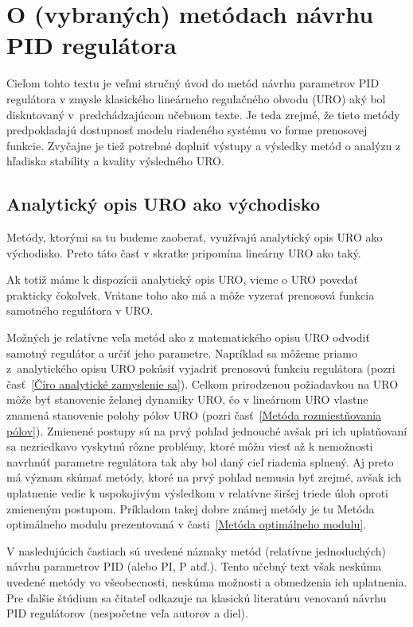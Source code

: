 \documentclass[a4paper, 10pt, ]{article}
\begin{document}
\section[O metódach návrhu PID regulátora]{O (vybraných) metódach návrhu PID regulátora}

Cieľom tohto textu je veľmi stručný úvod do metód návrhu parametrov PID regulátora v zmysle klasického lineárneho regulačného obvodu (URO) aký bol diskutovaný v~predchádzajúcom učebnom texte. Je teda zrejmé, že tieto metódy predpokladajú dostupnosť modelu riadeného systému vo forme prenosovej funkcie. Zvyčajne je tiež potrebné doplniť výstupy a výsledky metód o analýzu z hľadiska stability a kvality výsledného URO.


\subsection{Analytický opis URO ako východisko}

Metódy, ktorými sa tu budeme zaoberať, využívajú analytický opis URO ako východisko. Preto táto časť v skratke pripomína lineárny URO ako taký.

Ak totiž máme k dispozícii analytický opis URO, vieme o URO povedať prakticky čokoľvek. Vrátane toho ako má a môže vyzerať prenosová funkcia samotného regulátora v URO. 

Možných je relatívne veľa metód ako z matematického opisu URO odvodiť samotný regulátor a určiť jeho parametre. Napríklad sa môžeme priamo z~analytického opisu URO pokúsiť vyjadriť prenosovú funkciu regulátora (pozri časť~\ref{Číro analytické zamyslenie sa}). Celkom prirodzenou požiadavkou na URO môže byť stanovenie želanej dynamiky URO, čo v lineárnom URO vlastne znamená stanovenie polohy pólov URO (pozri časť~\ref{Metóda rozmiestňovania pólov}). Zmienené postupy sú na prvý pohľad jednouché avšak pri ich uplatňovaní sa nezriedkavo vyskytnú rôzne problémy, ktoré môžu viesť až k nemožnosti navrhnúť parametre regulátora tak aby bol daný cieľ riadenia splnený. Aj preto má význam skúmať metódy, ktoré na prvý pohľad nemusia byť zrejmé, avšak ich uplatnenie vedie k uspokojivým výsledkom v relatívne širšej triede úloh oproti zmieneným postupom. Príkladom takej dobre známej metódy je tu Metóda optimálneho modulu prezentovaná v časti~\ref{Metóda optimálneho modulu}.


V nasledujúcich častiach sú uvedené náznaky metód (relatívne jednoduchých) návrhu parametrov PID (alebo PI, P atď.). Tento učebný text však neskúma uvedené metódy vo všeobecnosti, neskúma možnosti a obmedzenia ich uplatnenia. Pre ďalšie štúdium sa čitateľ odkazuje na klasickú literatúru venovanú návrhu PID regulátorov (nespočetne veľa autorov a diel).
\end{document}
